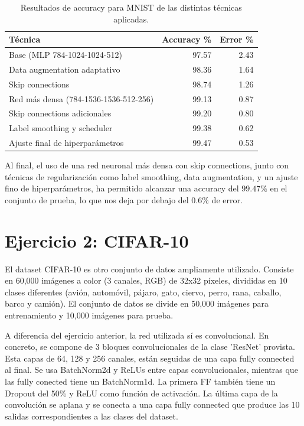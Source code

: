 \documentclass[11pt,spanish,listoffigures,listoftables]{tfgetsinf}
\begin{document}
\begin{table}[H]
\centering
\begin{tabular}{lrr}
    \toprule
    \textbf{Técnica} & \textbf{Accuracy \%} & \textbf{Error \%} \\
    \midrule
    Base (MLP 784-1024-1024-512) & 97.57 & 2.43 \\
    \midrule
    Data augmentation adaptativo & 98.36 & 1.64 \\
    Skip connections & 98.74 & 1.26 \\
    Red más densa (784-1536-1536-512-256) & 99.13 & 0.87 \\
    Skip connections adicionales & 99.20 & 0.80 \\
    Label smoothing y scheduler & 99.38 & 0.62 \\
    Ajuste final de hiperparámetros & 99.47 & 0.53 \\
    \bottomrule
\end{tabular}
\caption{Resultados de accuracy para MNIST de las distintas técnicas aplicadas.}
\label{tab:accuracy_mnist}
\end{table}

Al final, el uso de una red neuronal más densa con skip connections, junto con técnicas de regularización como label smoothing, data augmentation, y un ajuste fino de hiperparámetros, ha permitido alcanzar una accuracy del $99.47\%$ en el conjunto de prueba, lo que nos deja por debajo del $0.6\%$ de error.
\section{Ejercicio 2: CIFAR-10}
El dataset CIFAR-10 es otro conjunto de datos ampliamente utilizado. Consiste en 60,000 imágenes a color (3 canales, RGB) de 32x32 píxeles, divididas en 10 clases diferentes (avión, automóvil, pájaro, gato, ciervo, perro, rana, caballo, barco y camión). El conjunto de datos se divide en 50,000 imágenes para entrenamiento y 10,000 imágenes para prueba.

A diferencia del ejercicio anterior, la red utilizada sí es convolucional. En concreto, se compone de 3 bloques convolucionales de la clase 'ResNet' provista. Esta capas de 64, 128 y 256 canales, están seguidas de una capa fully connected al final. Se usa BatchNorm2d y ReLUs entre capas convolucionales, mientras que las fully conected tiene un BatchNorm1d. La primera FF también tiene un Dropout del 50\% y ReLU como función de activación. La última capa de la convolución se aplana y se conecta a una capa fully connected que produce las 10 salidas correspondientes a las clases del dataset. 
\end{document}
